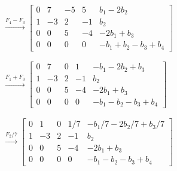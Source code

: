 \documentclass[handout]{beamer} %
\renewcommand{\_}[1]{_{\left[ #1 \right]}}
\renewcommand{\^}[1]{^{\left[ #1 \right]}}
\begin{document}
\begin{frame}

    {\footnotesize
    \begin{align*}
        &\stackrel{F_4-F_3}{\longrightarrow}
        \left[
            \begin{array}{cccc|c}
                0 & 7 & -5 & 5 & b_1 - 2b_2 \\
                1 & -3 & 2 & -1 & b_2 \\
                0 & 0 & 5 & -4 &-2b_1 + b_3 \\
                0 & 0 & 0 & 0 & -b_1 + b_2 - b_3 + b_4
            \end{array}
        \right]
        \\
        &{}^{}
        \\
        &\stackrel{F_1+F_3}{\longrightarrow}
        \left[
            \begin{array}{cccc|c}
                0 & 7 & 0 & 1 & -b_1 -2 b_2 + b_3 \\
                1 & -3 & 2 & -1 & b_2 \\
                0 & 0 & 5 & -4 &-2b_1 + b_3 \\
                0 & 0 & 0 & 0 & -b_1 - b_2 - b_3 + b_4
            \end{array}
        \right]
        \\
        &{}^{}
        \\
        &\stackrel{F_2/7}{\longrightarrow}
        \left[
            \begin{array}{cccc|c}
                0 & 1 & 0 & 1/7 & -b_1/7 -2 b_2/7 + b_3/7 \\
                1 & -3 & 2 & -1 & b_2 \\
                0 & 0 & 5 & -4 &-2b_1 + b_3 \\
                0 & 0 & 0 & 0 & -b_1 - b_2 - b_3 + b_4
            \end{array}
        \right]
    \end{align*}
    }
\end{frame}
\end{document}
